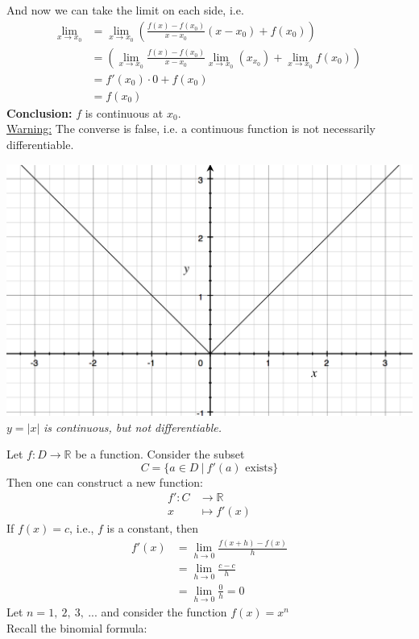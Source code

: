 \documentclass[]{article}
\begin{document}
	And now we can take the limit on each side, i.e.
	\begin{align*}
		\lim_{x\to x_0}&=\lim_{x\to x_0}\left(\frac{f(x)-f(x_0)}{x-x_0}(x-x_0)+f(x_0)\right)\\
		&=\left(\lim_{x\to x_0}\frac{f(x)-f(x_0)}{x-x_0}\lim_{x\to x_0}(x_{x_0})+\lim_{x\to x_0}f(x_0)\right)\\
		&=f'(x_0)\cdot 0+f(x_0)\\
		&=f(x_0)
	\end{align*}
	{\bf Conclusion:} $f$ is continuous at $x_0$.\\
	\underline{Warning:} The converse is false, i.e. a continuous function is not necessarily differentiable.\\
	\begin{center}	
		\includegraphics[scale=0.5]{./graphics/absx.png}\\
		$y=|x|$ \emph{is continuous, but not differentiable.}
	\end{center}
	Let $f:D\rightarrow\mathbb{R}$ be a function. Consider the subset
	$$
		C=\{a\in D~|~f'(a)\text{ exists}\}
	$$
	Then one can construct a new function:
	\begin{align*}
		f':C&\rightarrow\mathbb{R}\\
		x&\mapsto f'(x)
	\end{align*}
	If $f(x)=c$, i.e., $f$ is a constant, then
	\begin{align*}
		f'(x)&=\lim_{h\to 0}\frac{f(x+h)-f(x)}{h}\\
		&=\lim_{h\to 0}\frac{c-c}{h}\\
		&=\lim_{h\to 0}\frac{0}{h}=0
	\end{align*}
	Let $n=1,~2,~3,~...$ and consider the function $f(x)=x^n$\\
	Recall the binomial formula:\\
\end{document}
